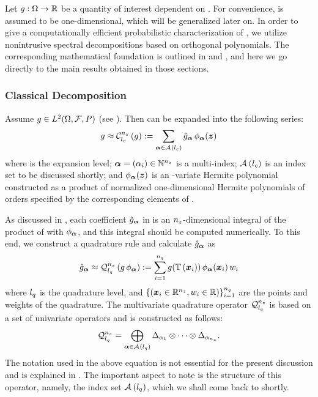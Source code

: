 Let $g: \Omega \to \mathbb{R}$ be a quantity of interest dependent on \vu. For
convenience, \g is assumed to be one-dimensional, which will be generalized
later on. In order to give a computationally efficient probabilistic
characterization of \g, we utilize nonintrusive spectral decompositions based on
orthogonal polynomials. The corresponding mathematical foundation is outlined in
 and , and here we go
directly to the main results obtained in those sections.

\subsubsection{Classical Decomposition}

Assume $\g \in \L{2}(\Omega, \mathcal{F}, \probability)$ (see
). Then \g can be expanded into the following series:
\[
  \g \approx \chaos{\nz}{\lc}{\g} := \sum_{\multiindex \in
  \multiindices{\lc}} \hat{\g}_{\multiindex} \, \phi_{\multiindex}(\vz)
\]
where \lc is the expansion level; $\boldsymbol{\alpha} = (\alpha_i) \in \mathbb{N}^{n_{z}}$ is
a multi-index; $\mathcal{A}_{}\left({l_{c}}\right)$ is an index set to be discussed shortly; and
$\phi_{\boldsymbol{\alpha}}(\boldsymbol{z})$ is an \nz-variate Hermite polynomial constructed as a
product of normalized one-dimensional Hermite polynomials of orders specified by
the corresponding elements of \multiindex.

As discussed in , each coefficient
$\hat{g}_{\boldsymbol{\alpha}}$ in  is an
${n_{z}}$-dimensional integral of the product of \g with $\phi_{\boldsymbol{\alpha}}$, and
this integral should be computed numerically. To this end, we construct a
quadrature rule and calculate $\hat{g}_{\boldsymbol{\alpha}}$ as
\begin{equation} \elab{numerical-integration}
  \hat{\g}_{\multiindex} \approx \quadrature{\nz}{\lq}{\g \,
  \phi_{\multiindex}} := \sum_{i = 1}^\nq \g(\transform{\v{x}_i}) \, \phi_{\multiindex}(\v{x}_i) \, w_i
\end{equation}
where ${l_{q}}$ is the quadrature level, and $\{ (\boldsymbol{x}_i \in \mathbb{R}^{n_{z}}, w_i \in
\mathbb{R}) \}_{i = 1}^{n_{q}}$ are the points and weights of the quadrature. The
multivariate quadrature operator $\quadrature{\nz}{\lq}$ is based on a set of
univariate operators and is constructed as follows:
\begin{equation} \elab{smolyak-sparse-grid}
  \quadrature{\nz}{\lq} = \bigoplus_{\multiindex \in \multiindices{\lq}}
  \Delta_{\alpha_1} \otimes \cdots \otimes \Delta_{\alpha_\nz}.
\end{equation}
The notation used in the above equation is not essential for the present
discussion and is explained in . The important
aspect to note is the structure of this operator, namely, the index set
$\mathcal{A}_{}\left({l_{q}}\right)$, which we shall come back to shortly.

